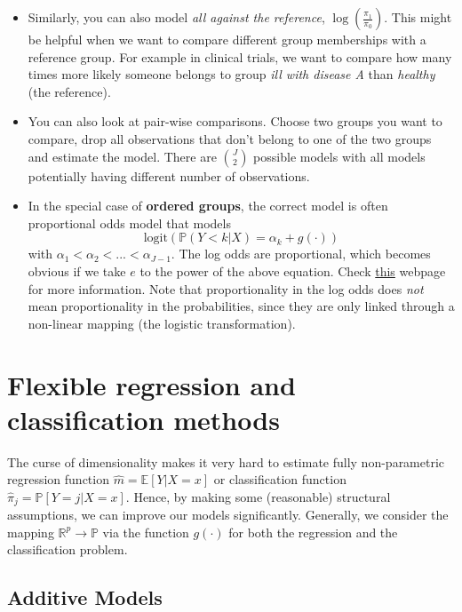 \documentclass[]{book}
\providecommand{\tightlist}{%
  \setlength{\itemsep}{0pt}\setlength{\parskip}{0pt}}
\begin{document}
\begin{itemize}
\tightlist
\item
  Similarly, you can also model \emph{all against the reference},
  \(\log(\frac{\pi_1}{\pi_0})\). This might be helpful when we want to
  compare different group memberships with a reference group. For
  example in clinical trials, we want to compare how many times more
  likely someone belongs to group \emph{ill with disease A} than
  \emph{healthy} (the reference).
\item
  You can also look at pair-wise comparisons. Choose two groups you want
  to compare, drop all observations that don't belong to one of the two
  groups and estimate the model. There are \(\binom{J}{2}\) possible
  models with all models potentially having different number of
  observations.
\item
  In the special case of \textbf{ordered groups}, the correct model is
  often proportional odds model that models
  \[\text{logit}(\mathbb{P}(Y < k |X) = \alpha_k + g(\cdot))\] with
  \(\alpha_1 < \alpha_2 < \text{...} < \alpha_{J-1}\). The log odds are
  proportional, which becomes obvious if we take \(e\) to the power of
  the above equation. Check
  \href{http://data.library.virginia.edu/fitting-and-interpreting-a-proportional-odds-model/}{this}
  webpage for more information. Note that proportionality in the log
  odds does \emph{not} mean proportionality in the probabilities, since
  they are only linked through a non-linear mapping (the logistic
  transformation).
\end{itemize}

\chapter{Flexible regression and classification
methods}\label{flexible-regression-and-classification-methods}

The curse of dimensionality makes it very hard to estimate fully
non-parametric regression function \(\hat{m} = \mathbb{E}[Y|X = x]\) or
classification function \(\hat{\pi}_j = \mathbb{P}[Y = j | X = x]\).
Hence, by making some (reasonable) structural assumptions, we can
improve our models significantly. Generally, we consider the mapping
\(\mathbb{R}^p \rightarrow \mathbb{P}\) via the function \(g(\cdot)\)
for both the regression and the classification problem.

\section{Additive Models}\label{additive-models}
\end{document}
